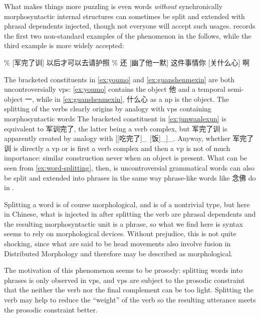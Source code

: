 \documentclass[UTF8, a4paper, oneside, scheme=plain]{ctexart}
\newcommand*{\citesec}[1]{\S~{#1}}
\begin{document}
What makes things more puzzling is even words \emph{without} synchronically morphosyntactic internal structures 
can sometimes be split and extended
with phrasal dependents injected,
though not everyone will accept such usages.
\citet[\citesec{6.5.8}]{chao1965grammar} records the first two non-standard examples of the phenomenon
in the follows,
while the third example is more widely accepted:
\begin{exe}
    \ex\label{ex:word-splitting} \begin{xlist}
        \ex\label{ex:junwanlexun} \% [军完了训] 以后才可以去请护照
        \ex\label{ex:youmo} \% 还 [幽了他一默]
        \ex\label{ex:guanshenmexin} 这件事情你 [关什么心] 啊
    \end{xlist}
\end{exe}
The bracketed constituents in \eqref{ex:youmo} and \eqref{ex:guanshenmexin} 
are both uncontroversially \acs{vp}s:
\eqref{ex:youmo} contains the object 他 and a temporal semi-object 一, %
while in \eqref{ex:guanshenmexin}, 什么心 as a \ac{np} is the object.
The splitting of the verbs clearly origins 
by analogy with \ac{vp}s containing morphosyntactic words 
The bracketed constituent in \eqref{ex:junwanlexun} is equivalent to 军训完了,
the latter being a verb complex, %
but 军完了训 is apparently created by analogy with 
[[吃完了]_{} [饭]_{}]_{}.
Anyway, whether 军完了训 is directly a \ac{vp} or is first a verb complex 
and then a \ac{vp} is not of much importance:
similar construction never when an object is present.
What can be seen from \eqref{ex:word-splitting}, then, 
is uncontroversial grammatical words can also be split and extended into phrases 
in the same way phrase-like words like 念佛 do in .

Splitting a word is of course morphological,
and is of a nontrivial type,
but here in Chinese, what is injected in after splitting the verb are phrasal dependents 
and the resulting morphosyntactic unit is a phrase,
so what we find here is syntax seems to rely on morphological devices.
Without prejudice, this is not quite shocking,
since what are said to be head movements 
also involve fusion in Distributed Morphology 
and therefore may be described as morphological.

The motivation of this phenomenon seems to be prosody: 
splitting words into phrases is only observed in \ac{vp}s,
and \ac{vp}s are subject to the prosodic constraint 
that the neither the verb nor the final complement can be too light.
Splitting the verb may help to reduce the ``weight'' of the verb 
so the resulting utterance meets the prosodic constraint better.
\end{document}
